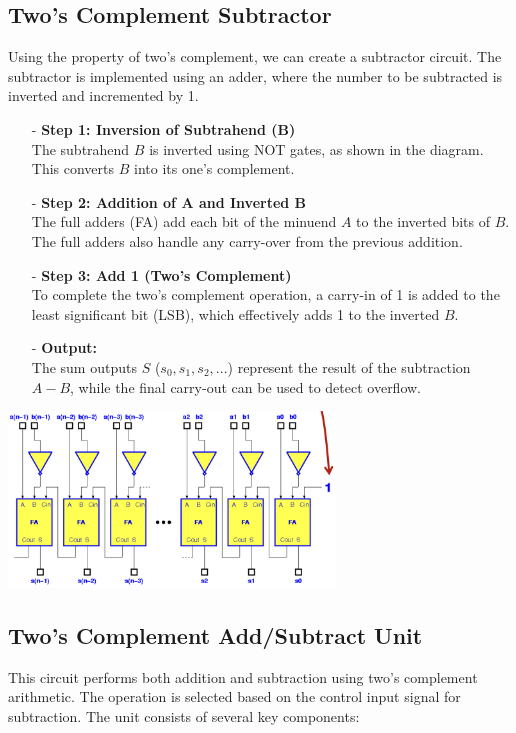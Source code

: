 \subsection{Two's Complement Subtractor}
Using the property of two's complement, we can create a subtractor circuit. The subtractor is implemented using an adder, where the number to be subtracted is inverted and incremented by 1.

\begin{itemize}
    \item[-] \textbf{Step 1: Inversion of Subtrahend (B)}\\
    The subtrahend $B$ is inverted using NOT gates, as shown in the diagram. This converts $B$ into its one's complement.
    
    \item[-] \textbf{Step 2: Addition of A and Inverted B}\\
    The full adders (FA) add each bit of the minuend $A$ to the inverted bits of $B$. The full adders also handle any carry-over from the previous addition.

    \item[-] \textbf{Step 3: Add 1 (Two's Complement)}\\
    To complete the two's complement operation, a carry-in of 1 is added to the least significant bit (LSB), which effectively adds 1 to the inverted $B$.

    \item[-] \textbf{Output:}\\
    The sum outputs $S$ ($s_0, s_1, s_2, ...$) represent the result of the subtraction $A - B$, while the final carry-out can be used to detect overflow.
\end{itemize}

\begin{center}
    \includegraphics[width=0.65\textwidth]{chapters/chapter1e/images/substractor.png}
\end{center}

\subsection{Two's Complement Add/Subtract Unit}
This circuit performs both addition and subtraction using two's complement arithmetic. The operation is selected based on the control input signal for subtraction. The unit consists of several key components:

